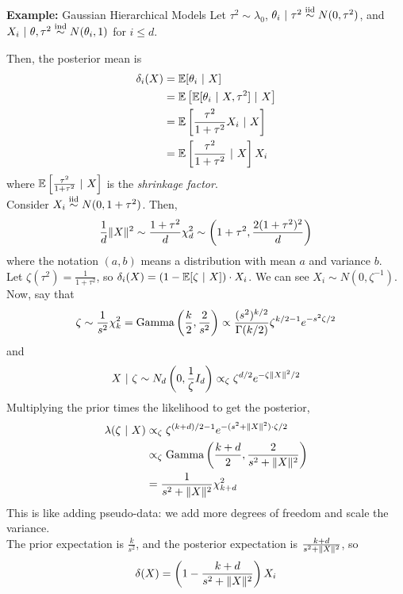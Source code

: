 \begin{example}{\textbf{Example:} Gaussian Hierarchical Models}
    Let $\tau^2 \sim \lambda_0$, $\theta_i \given \tau^2 \iidsim N(0, \tau^2)$, and $X_i \given \theta, \tau^2 \overset{\tt{ind}}{\sim} N(\theta_i, 1)$ for $i \leq d$.

    Then, the posterior mean is
    \begin{align*}
        \delta_i(X) &= \bb{E}[\theta_i \given X]\\
        &= \bb{E}\left[\bb{E}[\theta_i \given X, \tau^2] \given X\right]\\
        &= \bb{E}\left[\frac{\tau^2}{1 + \tau^2}X_i \given X\right]\\
        &= \bb{E}\left[\frac{\tau^2}{1 + \tau^2} \given X\right]X_i
    \end{align*}
    where $\bb{E}\left[\frac{\tau^2}{1 + \tau^2} \given X\right]$ is the \emph{shrinkage factor}.\\

    Consider $X_i \iidsim N(0, 1 + \tau^2)$. Then,
    \[ \frac{1}{d}\norm{X}^2 \sim \frac{1 + \tau^2}{d}\chi_d^2 \sim \left(1 + \tau^2, \frac{2(1 + \tau^2)^2}{d}\right) \]
    where the notation $(a, b)$ means a distribution with mean $a$ and variance $b$.\\

    Let $\zeta(\tau^2) = \frac{1}{1 + \tau^2}$, so $\delta_i(X) = (1 - \bb{E}[\zeta \given X]) \cdot X_i$. We can see $X_i \sim N(0, \zeta^{-1})$. Now, say that
    \[ \zeta \sim \frac{1}{s^2}\chi_k^2 = \tt{Gamma}\left(\frac{k}{2}, \frac{2}{s^2}\right) \propto \frac{(s^2)^{k/2}}{\Gamma(k/2)}\zeta^{k/2 - 1}e^{-s^2\zeta/2} \]
    and
    \[ X \given \zeta \sim N_d\left(0, \frac{1}{\zeta}I_d\right) \propto_{\zeta} \zeta^{d/2}e^{-\zeta\norm{X}^2/2} \]
    Multiplying the prior times the likelihood to get the posterior,
    \begin{align*}
        \lambda(\zeta \given X) &\propto_{\zeta} \zeta^{(k + d)/2 - 1}e^{-(s^2 + \norm{X}^2) \cdot \zeta/2}\\
        &\propto_{\zeta} \tt{Gamma}\left(\frac{k + d}{2}, \frac{2}{s^2 + \norm{X}^2}\right)\\
        &= \frac{1}{s^2 + \norm{X}^2}\chi_{k + d}^2
    \end{align*}
    This is like adding pseudo-data: we add more degrees of freedom and scale the variance.\\

    The prior expectation is $\frac{k}{s^2}$, and the posterior expectation is $\frac{k + d}{s^2 + \norm{X}^2}$, so
    \[ \delta(X) = \left(1 - \frac{k + d}{s^2 + \norm{X}^2}\right)X_i \]
\end{example}

